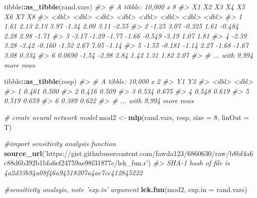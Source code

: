 \documentclass[]{book}
\newenvironment{Shaded}{\begin{snugshade}}{\end{snugshade}}
\newcommand{\CommentTok}[1]{\textcolor[rgb]{0.56,0.35,0.01}{\textit{#1}}}
\newcommand{\DataTypeTok}[1]{\textcolor[rgb]{0.13,0.29,0.53}{#1}}
\newcommand{\DecValTok}[1]{\textcolor[rgb]{0.00,0.00,0.81}{#1}}
\newcommand{\KeywordTok}[1]{\textcolor[rgb]{0.13,0.29,0.53}{\textbf{#1}}}
\newcommand{\NormalTok}[1]{#1}
\newcommand{\OperatorTok}[1]{\textcolor[rgb]{0.81,0.36,0.00}{\textbf{#1}}}
\newcommand{\StringTok}[1]{\textcolor[rgb]{0.31,0.60,0.02}{#1}}
\begin{document}
\begin{Shaded}
\begin{Highlighting}[]
\NormalTok{tibble}\OperatorTok{::}\KeywordTok{as_tibble}\NormalTok{(rand.vars)}
\CommentTok{#> # A tibble: 10,000 x 8}
\CommentTok{#>        X1     X2     X3     X4     X5    X6    X7     X8}
\CommentTok{#>     <dbl>  <dbl>  <dbl>  <dbl>  <dbl> <dbl> <dbl>  <dbl>}
\CommentTok{#> 1  1.61    2.13   2.13   3.97  -1.34   2.00  3.11 -2.55 }
\CommentTok{#> 2 -1.25    3.07  -0.325  1.61  -0.484  2.28  2.98 -1.71 }
\CommentTok{#> 3 -3.17   -1.29  -1.77  -1.66  -0.549 -3.19  1.07  1.81 }
\CommentTok{#> 4 -2.39    3.28  -3.42  -0.160 -1.52   2.67  7.05 -1.14 }
\CommentTok{#> 5 -1.55   -0.181 -1.14   2.27  -1.68  -1.67  3.08  0.334}
\CommentTok{#> 6  0.0690 -1.54  -2.98   2.84   1.42   1.31  1.82  2.07 }
\CommentTok{#> # ... with 9,994 more rows}
\end{Highlighting}
\end{Shaded}

\begin{Shaded}
\begin{Highlighting}[]
\NormalTok{tibble}\OperatorTok{::}\KeywordTok{as_tibble}\NormalTok{(resp)}
\CommentTok{#> # A tibble: 10,000 x 2}
\CommentTok{#>      Y1    Y2}
\CommentTok{#>   <dbl> <dbl>}
\CommentTok{#> 1 0.461 0.500}
\CommentTok{#> 2 0.416 0.509}
\CommentTok{#> 3 0.534 0.675}
\CommentTok{#> 4 0.548 0.619}
\CommentTok{#> 5 0.519 0.659}
\CommentTok{#> 6 0.389 0.622}
\CommentTok{#> # ... with 9,994 more rows}
\end{Highlighting}
\end{Shaded}

\begin{Shaded}
\begin{Highlighting}[]
\CommentTok{# create neural network model}
\NormalTok{mod2 <-}\StringTok{ }\KeywordTok{mlp}\NormalTok{(rand.vars, resp, }\DataTypeTok{size =} \DecValTok{8}\NormalTok{, }\DataTypeTok{linOut =}\NormalTok{ T)}
 
\CommentTok{#import sensitivity analysis function}
\KeywordTok{source_url}\NormalTok{(}\StringTok{'https://gist.githubusercontent.com/fawda123/6860630/raw/b8bf4a6c88d6b392b1bfa6ef24759ae98f31877c/lek_fun.r'}\NormalTok{)}
\CommentTok{#> SHA-1 hash of file is 4a2d33b94a08f46a94518207a4ae7cc412845222}
 
\CommentTok{#sensitivity analsyis, note 'exp.in' argument}
\KeywordTok{lek.fun}\NormalTok{(mod2, }\DataTypeTok{exp.in =}\NormalTok{ rand.vars)}
\end{Highlighting}
\end{Shaded}
\end{document}
